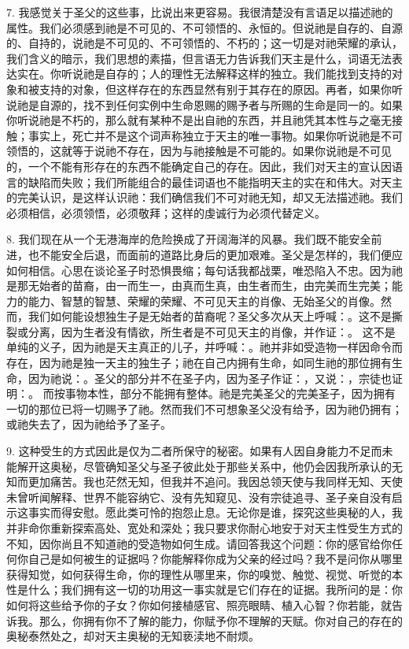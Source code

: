7. 我感觉关于圣父的这些事，比说出来更容易。我很清楚没有言语足以描述祂的属性。我们必须感到祂是不可见的、不可领悟的、永恒的。但说祂是自存的、自源的、自持的，说祂是不可见的、不可领悟的、不朽的；这一切是对祂荣耀的承认，我们含义的暗示，我们思想的素描，但言语无力告诉我们天主是什么，词语无法表达实在。你听说祂是自存的；人的理性无法解释这样的独立。我们能找到支持的对象和被支持的对象，但这样存在的东西显然有别于其存在的原因。再者，如果你听说祂是自源的，找不到任何实例中生命恩赐的赐予者与所赐的生命是同一的。如果你听说祂是不朽的，那么就有某种不是出自祂的东西，并且祂凭其本性与之毫无接触；事实上，死亡并不是这个词声称独立于天主的唯一事物。如果你听说祂是不可领悟的，这就等于说祂不存在，因为与祂接触是不可能的。如果你说祂是不可见的，一个不能有形存在的东西不能确定自己的存在。因此，我们对天主的宣认因语言的缺陷而失败；我们所能组合的最佳词语也不能指明天主的实在和伟大。对天主的完美认识，是这样认识祂：我们确信我们不可对祂无知，却又无法描述祂。我们必须相信，必须领悟，必须敬拜；这样的虔诚行为必须代替定义。\par

8. 我们现在从一个无港海岸的危险换成了开阔海洋的风暴。我们既不能安全前进，也不能安全后退，而面前的道路比身后的更加艰难。圣父是怎样的，我们便应如何相信。心思在谈论圣子时恐惧畏缩；每句话我都战栗，唯恐陷入不忠。因为祂是那无始者的苗裔，由一而生一，由真而生真，由生者而生，由完美而生完美；能力的能力、智慧的智慧、荣耀的荣耀、不可见天主的肖像、无始圣父的肖像。然而，我们如何能设想独生子是无始者的苗裔呢？圣父多次从天上呼喊：。这不是撕裂或分离，因为生者没有情欲，所生者是不可见天主的肖像，并作证：。 这不是单纯的义子，因为祂是天主真正的儿子，并呼喊：。祂并非如受造物一样因命令而存在，因为祂是独一天主的独生子；祂在自己内拥有生命，如同生祂的那位拥有生命，因为祂说：。圣父的部分并不在圣子内，因为圣子作证：，又说：，宗徒也证明：。 而按事物本性，部分不能拥有整体。祂是完美圣父的完美圣子，因为拥有一切的那位已将一切赐予了祂。然而我们不可想象圣父没有给予，因为祂仍拥有；或祂失去了，因为祂给予了圣子。\par

9. 这种受生的方式因此是仅为二者所保守的秘密。如果有人因自身能力不足而未能解开这奥秘，尽管确知圣父与圣子彼此处于那些关系中，他仍会因我所承认的无知而更加痛苦。我也茫然无知，但我并不追问。我因总领天使与我同样无知、天使未曾听闻解释、世界不能容纳它、没有先知窥见、没有宗徒追寻、圣子亲自没有启示这事实而得安慰。愿此类可怜的抱怨止息。无论你是谁，探究这些奥秘的人，我并非命你重新探索高处、宽处和深处；我只要求你耐心地安于对天主性受生方式的不知，因你尚且不知道祂的受造物如何生成。请回答我这个问题：你的感官给你任何你自己是如何被生的证据吗？你能解释你成为父亲的经过吗？我不是问你从哪里获得知觉，如何获得生命，你的理性从哪里来，你的嗅觉、触觉、视觉、听觉的本性是什么；我们拥有这一切的功用这一事实就是它们存在的证据。我所问的是：你如何将这些给予你的子女？你如何接植感官、照亮眼睛、植入心智？你若能，就告诉我。那么，你拥有你不了解的能力，你赋予你不理解的天赋。你对自己的存在的奥秘泰然处之，却对天主奥秘的无知亵渎地不耐烦。\par

